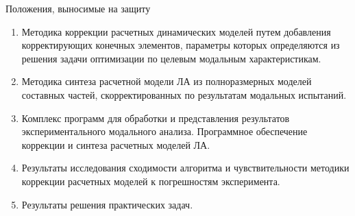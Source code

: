 \begin{frame}{Положения, выносимые на защиту}
	\begin{enumerate}
		\item Методика коррекции расчетных динамических моделей путем добавления корректирующих конечных элементов, параметры которых определяются из решения задачи оптимизации по целевым модальным характеристикам.
		\item Методика синтеза расчетной модели ЛА из полноразмерных моделей составных частей, скорректированных по результатам модальных испытаний.
		\item Комплекс программ для обработки и представления результатов экспериментального модального анализа. Программное обеспечение коррекции и синтеза расчетных моделей ЛА.
		\item Результаты исследования сходимости алгоритма и чувствительности методики коррекции расчетных моделей к погрешностям эксперимента.
		\item Результаты решения практических задач.
	\end{enumerate}
\end{frame}